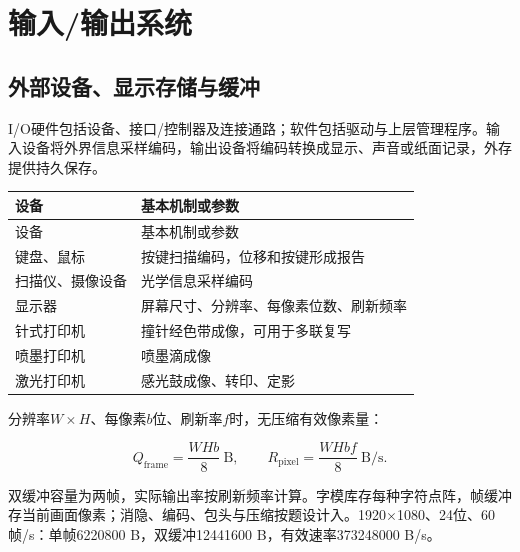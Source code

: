 \chapter{输入/输出系统}\label{CO07}

\section{外部设备、显示存储与缓冲}\label{CO07-peripherals}

I/O硬件包括设备、接口/控制器及连接通路；软件包括驱动与上层管理程序。输入设备将外界信息采样编码，输出设备将编码转换成显示、声音或纸面记录，外存提供持久保存。

\par\smallskip
{\fontsize{9.3}{12}\selectfont\setlength{\tabcolsep}{2.5pt}\setlength{\LTleft}{0pt}\setlength{\LTright}{0pt}
\begin{longtable}{@{}>{\raggedright\arraybackslash}p{}>{\raggedright\arraybackslash}p{}@{}}
\toprule
设备 & 基本机制或参数 \\

\midrule\endfirsthead\toprule
设备 & 基本机制或参数 \\

\midrule\endhead\bottomrule\endfoot
键盘、鼠标 & 按键扫描编码，位移和按键形成报告 \\

扫描仪、摄像设备 & 光学信息采样编码 \\

显示器 & 屏幕尺寸、分辨率、每像素位数、刷新频率 \\

针式打印机 & 撞针经色带成像，可用于多联复写 \\

喷墨打印机 & 喷墨滴成像 \\

激光打印机 & 感光鼓成像、转印、定影 \\

\end{longtable}}
\par\smallskip

分辨率\(W\times H\)、每像素\(b\)位、刷新率\(f\)时，无压缩有效像素量：

\[
Q_{\mathrm{frame}}=\frac{WHb}{8}\ \mathrm B,\qquad
R_{\mathrm{pixel}}=\frac{WHbf}{8}\ \mathrm{B/s}.
\]

双缓冲容量为两帧，实际输出率按刷新频率计算。字模库存每种字符点阵，帧缓冲存当前画面像素；消隐、编码、包头与压缩按题设计入。1920\ensuremath{\times}1080、24位、60帧/s：单帧6220800 B，双缓冲12441600 B，有效速率373248000 B/s。

